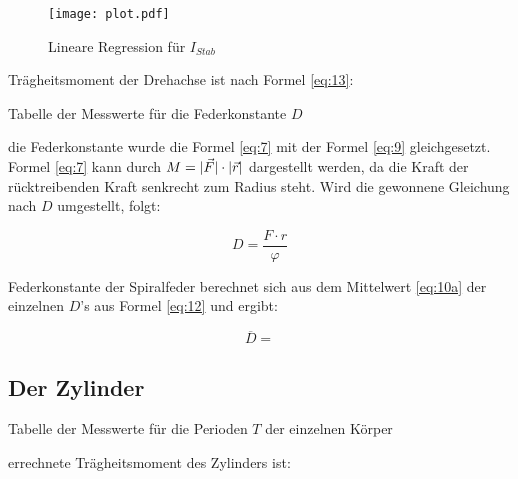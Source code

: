 \begin{figure}[H]
    \centering
    \texttt{[image: plot.pdf]}
    \caption{Lineare Regression für $I_{Stab}$}
    \label{fig:1}
\end{figure}

\justifying Trägheitsmoment der Drehachse ist nach Formel \eqref{eq:13}:

\begin{table}[H] %
    \centering
    
    \caption{Tabelle der Messwerte für die Federkonstante $D$}
    \label{tab:D}
\end{table}

\justifying die Federkonstante wurde die Formel \eqref{eq:7} mit der Formel \eqref{eq:9} gleichgesetzt. Formel \eqref{eq:7} kann durch $M = \lvert\vec{F}\rvert \cdot \lvert\vec{r}\rvert$
dargestellt werden, da die Kraft der rücktreibenden Kraft senkrecht zum Radius steht. Wird die gewonnene Gleichung nach $D$ umgestellt, folgt:

\begin{equation}
D = \frac{F\cdot r}{\varphi}\label{eq:15}
\end{equation}

\justifying Federkonstante der Spiralfeder berechnet sich aus dem Mittelwert \eqref{eq:10a} der einzelnen $D$'s aus 
Formel \eqref{eq:12} und ergibt:

\begin{equation}
\overline{D} = \text{} \label{eq:16} %
\end{equation}

\subsection{Der Zylinder}\justifying %

\begin{table}[H]
    \centering
    
    \caption{Tabelle der Messwerte für die Perioden $T$ der einzelnen Körper}
    \label{tab:I}
\end{table}


\justifying errechnete Trägheitsmoment des Zylinders ist:


